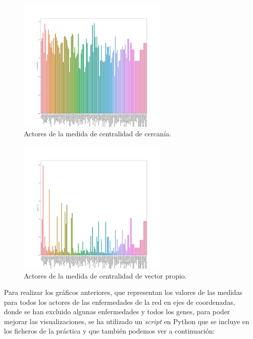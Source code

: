 \documentclass{uimppracticas}
\begin{document}
\begin{figure}[H]
	\centering
	\includegraphics[width=0.65\textwidth]{images/closnesscentrality}
	\caption{Actores de la medida de centralidad de cercanía.}
	\label{closnesscentrality}
\end{figure}

\begin{figure}[H]
	\centering
	\includegraphics[width=0.65\textwidth]{images/eigencentrality}
	\caption{Actores de la medida de centralidad de vector propio.}
	\label{eigencentrality}
\end{figure}

Para realizar los gráficos anteriores, que representan los valores de las medidas para todos los actores de las enfermedades de la red en ejes de coordenadas, donde se han excluido algunas enfermedades y todos los genes, para poder mejorar las visualizaciones, se ha utilizado un \textit{script} en Python que se incluye en los ficheros de la práctica y que también podemos ver a continuación:
\end{document}
